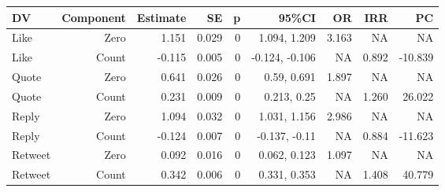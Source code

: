 
\begin{tabular}{lrrrrrrrr}
\toprule
DV & Component & Estimate & SE & p & 95\%CI & OR & IRR & PC\\
\midrule
Like & Zero & 1.151 & 0.029 & 0 & 1.094, 1.209 & 3.163 & NA & NA\\
Like & Count & -0.115 & 0.005 & 0 & -0.124, -0.106 & NA & 0.892 & -10.839\\
Quote & Zero & 0.641 & 0.026 & 0 & 0.59, 0.691 & 1.897 & NA & NA\\
Quote & Count & 0.231 & 0.009 & 0 & 0.213, 0.25 & NA & 1.260 & 26.022\\
Reply & Zero & 1.094 & 0.032 & 0 & 1.031, 1.156 & 2.986 & NA & NA\\
Reply & Count & -0.124 & 0.007 & 0 & -0.137, -0.11 & NA & 0.884 & -11.623\\
Retweet & Zero & 0.092 & 0.016 & 0 & 0.062, 0.123 & 1.097 & NA & NA\\
Retweet & Count & 0.342 & 0.006 & 0 & 0.331, 0.353 & NA & 1.408 & 40.779\\
\bottomrule
\end{tabular}
